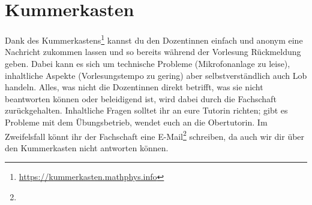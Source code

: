 \section{Kummerkasten}
\label{kummerkasten}

Dank des Kummerkastens\footnote{\url{https://kummerkasten.mathphys.info}} kannst du den Dozentinnen einfach und anonym eine Nachricht zukommen lassen und so bereits während der Vorlesung Rückmeldung geben. Dabei kann es sich um technische Probleme (Mikrofonanlage zu leise), inhaltliche Aspekte (Vorlesungstempo zu gering) aber selbstverständlich auch Lob handeln. Alles, was nicht die Dozentinnen direkt betrifft, was sie nicht beantworten können oder beleidigend ist, wird dabei durch die Fachschaft zurückgehalten. Inhaltliche Fragen solltet ihr an eure Tutorin richten; gibt es Probleme mit dem Übungsbetrieb, wendet euch an die Obertutorin. Im Zweifelsfall könnt ihr der Fachschaft eine E-Mail\footnote{} schreiben, da auch wir dir über den Kummerkasten nicht antworten können.
